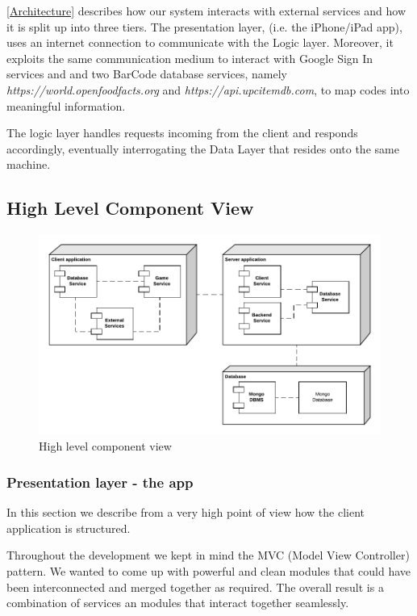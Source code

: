 \documentclass[paper=a4, fontsize=12pt]{scrartcl}
\numberwithin{equation}{section}		%
\numberwithin{figure}{section}			%
\numberwithin{table}{section}				%
\begin{document}
\ref{Architecture} describes how our system interacts with external services and how it is split up into three tiers. The presentation layer, (i.e. the iPhone/iPad app), uses an internet connection to communicate with the Logic layer. Moreover, it exploits the same communication medium to interact with Google Sign In services and and two BarCode database services, namely \textit{https://world.openfoodfacts.org} and \textit{https://api.upcitemdb.com}, to map codes into meaningful information. 

The logic layer handles requests incoming from the client and responds accordingly, eventually interrogating the Data Layer that resides onto the same machine. 

\subsection{High Level Component View}


\begin{figure}[H]
\begin{center}
    \includegraphics[width=0.8\linewidth]{high_level.png}
    \caption{High level component view}
    \label{High Level}
\end{center}
\end{figure}

\subsubsection{Presentation layer - the app}

In this section we describe from a very high point of view how the client application is structured.

Throughout the development we kept in mind the MVC (Model View Controller) pattern.
We wanted to come up with powerful and clean modules that could have been interconnected and merged together as required. 
The overall result is a combination of services an modules that interact together seamlessly.
\end{document}
